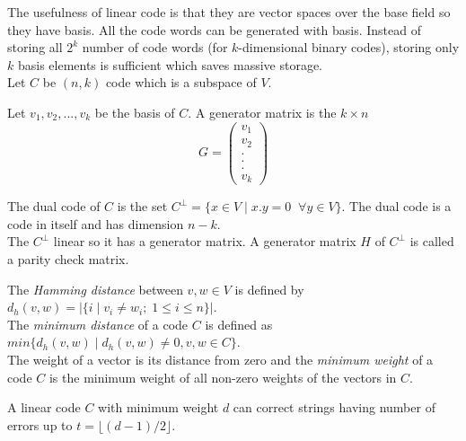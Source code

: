 The usefulness of linear code is that they are vector spaces over the base field so they have basis. All the code words can be generated with basis. Instead of storing all \(2^k\) number of code words (for \(k\)-dimensional binary codes), storing only \(k\) basis elements is sufficient which saves massive storage.\\[2mm]
Let \(C\) be \((n,k)\) code which is a subspace of \(V\).

\begin{definition}
     Let \(v_1, v_2,...,v_k\) be the basis of \(C\). A generator matrix is the \(k \times n\)
    \[G=\begin{pmatrix}
        v_1\\
        v_2\\
        .\\
        .\\
        .\\
        v_k
        \end{pmatrix}
\]
\end{definition}
\vspace{2mm}

\begin{definition}
    The dual code of \(C\) is the set \(C^{\perp}=\{x \in V \;| \; x.y=0 \;\; \forall y \in V \}\). The dual code is a code in itself and has dimension \(n-k\).\\
    The \(C^{\perp}\) linear so it has a generator matrix. A generator matrix \(H\) of \(C^{\perp}\) is called a parity check matrix. 
\end{definition}

\begin{definition}
    The \textit{Hamming distance} between \(v,w \in V\) is defined by \(d_h(v,w)=|\{i\;|\; v_i \neq w_i;\; 1 \leq i \leq n \}|\).\\
    The \textit{minimum distance} of a code \(C\) is defined as \(min\{d_h(v,w)\;|\; d_h(v,w) \neq 0, v,w \in C\}\).\\
    The weight of a vector is its distance from zero and the \textit{minimum weight} of a code \(C\) is the minimum weight of all non-zero weights of the vectors in \(C\).
\end{definition}

\begin{theorem}
A linear code \(C\) with minimum weight \(d\) can correct strings having number of errors up to \(t= \lfloor (d-1)/2 \rfloor\).
\end{theorem}

